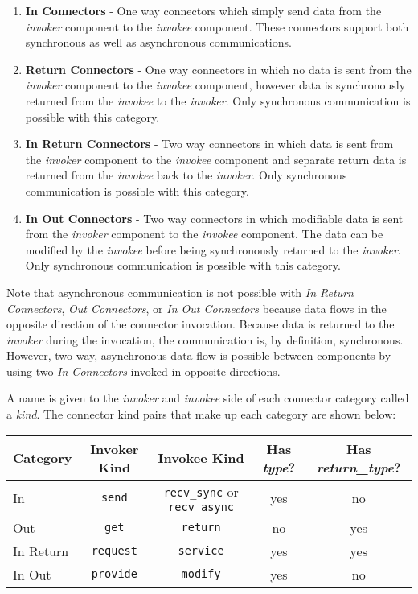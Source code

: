 \begin{enumerate}[{1.}]
  \item \textbf{In Connectors} - One way connectors which simply send data from the \textit{invoker} component to the \textit{invokee} component. These connectors support both synchronous as well as asynchronous communications.
  \item \textbf{Return Connectors} - One way connectors in which no data is sent from the \textit{invoker} component to the \textit{invokee} component, however data is synchronously returned from the \textit{invokee} to the \textit{invoker}. Only synchronous communication is possible with this category.
  \item \textbf{In Return Connectors} - Two way connectors in which data is sent from the \textit{invoker} component to the \textit{invokee} component and separate return data is returned from the \textit{invokee} back to the \textit{invoker}. Only synchronous communication is possible with this category.
  \item \textbf{In Out Connectors} - Two way connectors in which modifiable data is sent from the \textit{invoker} component to the \textit{invokee} component. The data can be modified by the \textit{invokee} before being synchronously returned to the \textit{invoker}. Only synchronous communication is possible with this category.
\end{enumerate}

Note that asynchronous communication is not possible with \textit{In Return Connectors}, \textit{Out Connectors}, or \textit{In Out Connectors} because data flows in the opposite direction of the connector invocation. Because data is returned to the \textit{invoker} during the invocation, the communication is, by definition, synchronous. However, two-way, asynchronous data flow is possible between components by using two \textit{In Connectors} invoked in opposite directions.

A name is given to the \textit{invoker} and \textit{invokee} side of each connector category called a \textit{kind}. The connector kind pairs that make up each category are shown below:

\begin{center}
  \begin{tabular}{ | l | c | c | c | c |}
    \hline
    \textbf{Category} & \textbf{Invoker Kind} & \textbf{Invokee Kind} & \textbf{Has \textit{type}?} & \textbf{Has \textit{return\_type}?} \\ \hline
    In & \texttt{send} & \texttt{recv\_sync} or \texttt{recv\_async} & yes & no \\ \hline
    Out & \texttt{get} & \texttt{return} & no & yes \\ \hline
    In Return & \texttt{request} & \texttt{service} & yes & yes \\ \hline
    In Out & \texttt{provide} & \texttt{modify} & yes & no \\ \hline
  \end{tabular}
\end{center}

